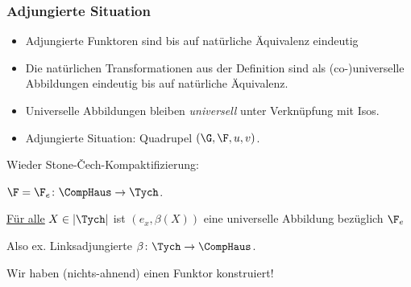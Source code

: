 \begin{frame}
  \frametitle{Adjungierte Situation}

  \begin{itemize}
    \item<+-> Adjungierte Funktoren sind bis auf natürliche Äquivalenz eindeutig
    \item<+-> Die natürlichen Transformationen aus der Definition sind als (co-)universelle Abbildungen eindeutig bis auf natürliche Äquivalenz.
    \item<+-> Universelle Abbildungen bleiben \emph{universell} unter Verknüpfung mit Isos.
    \item<+-> Adjungierte Situation: Quadrupel $(\G, \F, u, v)$. 
  \end{itemize}

\pause

  \begin{ex*}
     Wieder Stone-\v{C}ech-Kompaktifizierung:

     $\F = \F_e \colon \CompHaus \to \Tych$.

\pause

     \underline{Für alle} $X \in |\Tych|$ ist $(e_x, \beta(X))$ eine universelle Abbildung bezüglich $\F_e$
     
     Also ex. Linksadjungierte $\beta \colon \Tych \to \CompHaus$.
     \vspace{1em}

\pause

     Wir haben (nichts-ahnend) einen Funktor konstruiert!
  \end{ex*}

\end{frame}

